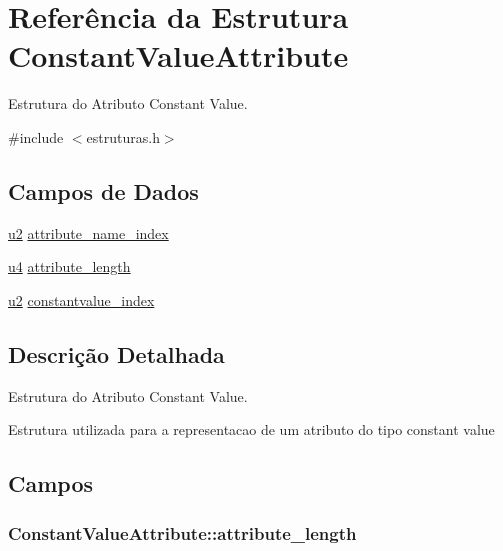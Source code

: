 \hypertarget{struct_constant_value_attribute}{}\section{Referência da Estrutura Constant\+Value\+Attribute}
\label{struct_constant_value_attribute}


Estrutura do Atributo Constant Value.  




{\ttfamily \#include $<$estruturas.\+h$>$}

\subsection*{Campos de Dados}
\begin{DoxyCompactItemize}
\item 
\hyperlink{estruturas_8h_a5f223212eef04d10a4550ded680cb1cf}{u2} \hyperlink{struct_constant_value_attribute_a29106b223531e4e2178ab37b7653c758}{attribute\+\_\+name\+\_\+index}
\item 
\hyperlink{estruturas_8h_aedf6ddc03df8caaaccbb4c60b9a9b850}{u4} \hyperlink{struct_constant_value_attribute_a18bd9666c237d41452d4ff5047e6c048}{attribute\+\_\+length}
\item 
\hyperlink{estruturas_8h_a5f223212eef04d10a4550ded680cb1cf}{u2} \hyperlink{struct_constant_value_attribute_acc45997fb7ce815924e042fec885525e}{constantvalue\+\_\+index}
\end{DoxyCompactItemize}


\subsection{Descrição Detalhada}
Estrutura do Atributo Constant Value. 

Estrutura utilizada para a representacao de um atributo do tipo constant value 

\subsection{Campos}
\subsubsection[{\texorpdfstring{attribute\+\_\+length}{attribute_length}}]{ Constant\+Value\+Attribute\+::attribute\+\_\+length}\hypertarget{struct_constant_value_attribute_a18bd9666c237d41452d4ff5047e6c048}{}\label{struct_constant_value_attribute_a18bd9666c237d41452d4ff5047e6c048}
